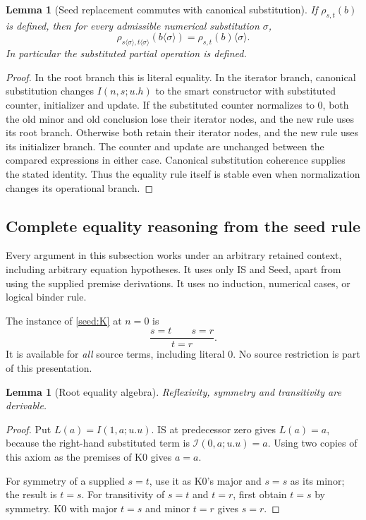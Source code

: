 \documentclass[11pt,a4paper]{article}
\newtheorem{lemma}[theorem]{Lemma}
\theoremstyle{definition}
\begin{document}
\begin{lemma}[Seed replacement commutes with canonical substitution]
\label{seed:substitution}
If $\rho_{s,t}(b)$ is defined, then for every admissible numerical
substitution $\sigma$,
\[
 \rho_{s\langle\sigma\rangle,t\langle\sigma\rangle}
       (b\langle\sigma\rangle)
 =\rho_{s,t}(b)\langle\sigma\rangle.
\]
In particular the substituted partial operation is defined.
\end{lemma}
\begin{proof}
In the root branch this is literal equality. In the iterator branch,
canonical substitution changes $I(n,s;u.h)$ to the smart constructor
with substituted counter, initializer and update. If the substituted
counter normalizes to $0$, both the old minor and old conclusion lose
their iterator nodes, and the new rule uses its root branch. Otherwise
both retain their iterator nodes, and the new rule uses its initializer
branch. The counter and update are unchanged between the compared
expressions in either case. Canonical substitution coherence supplies
the stated identity. Thus the equality rule itself is stable even when
normalization changes its operational branch.
\end{proof}

\subsection{Complete equality reasoning from the seed rule}

Every argument in this subsection works under an arbitrary retained
context, including arbitrary equation hypotheses. It uses only IS and
Seed, apart from using the supplied premise derivations. It uses no
induction, numerical cases, or logical binder rule.

The instance of \eqref{seed:K} at $n=0$ is
\[
 \frac{s=t\qquad s=r}{t=r}.
 \tag{K0}\label{seed:K0}
\]
It is available for \emph{all} source terms, including literal $0$.
No source restriction is part of this presentation.

\begin{lemma}[Root equality algebra]\label{seed:algebra}
Reflexivity, symmetry and transitivity are derivable.
\end{lemma}
\begin{proof}
Put $L(a)=I(1,a;u.u)$. IS at predecessor zero gives $L(a)=a$,
because the right-hand substituted term is $\mathcal I(0,a;u.u)=a$.
Using two copies of this axiom as the premises of K0 gives $a=a$.

For symmetry of a supplied $s=t$, use it as K0's major and $s=s$
as its minor; the result is $t=s$. For transitivity of $s=t$ and
$t=r$, first obtain $t=s$ by symmetry. K0 with major $t=s$ and
minor $t=r$ gives $s=r$.
\end{proof}
\end{document}
